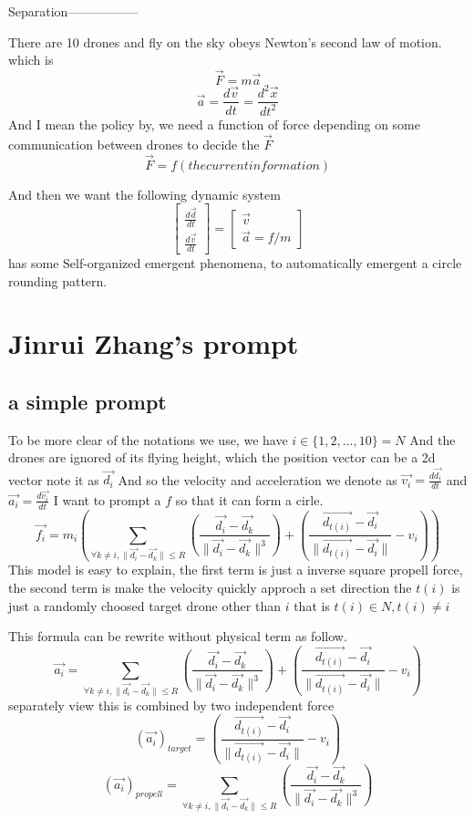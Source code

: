 \documentclass{article}
\theoremstyle{definition} %
\begin{document}
Separation-----------------

There are 10 drones and fly on the sky
obeys Newton's second law of motion.
which is
\[
    \vec{F} = m \vec{a}
\]
\[
    \vec{a} = \frac{d\vec{v}}{dt} = \frac{d^2 \vec{x}}{dt^2}
\]
And I mean the policy by, we need a function of force
depending on some communication between drones
to decide the \(\vec{F}\)
\[
    \vec{F}=f(the current information)
\]

And then we want the following dynamic system
\[\begin{bmatrix}
        \frac{d\vec{d}}{dt} \\
        \frac{d\vec{v}}{dt}
    \end{bmatrix}=
    \begin{bmatrix}
        \vec{v} \\
        \vec{a}=f/m
    \end{bmatrix}
\]
has some Self-organized emergent phenomena,
to automatically emergent a circle rounding pattern.

\section{Jinrui Zhang's prompt}
\subsection{a simple prompt}
To be more clear of the notations we use,
we have \(i\in\{1,2,...,10\}=N\)
And the drones are ignored of its flying
height, which the position vector can be a
2d vector note it as \(\vec{d_i}\)
And so the velocity and acceleration we denote as
\(\vec{v_i}=\frac{d\vec{d_i}}{dt}\)
and
\(\vec{a_i}=\frac{d\vec{v_i}}{dt}\)
I want to prompt a \(f\) so that it can form
a cirle.
\[
    \vec{f_i}=m_i(\sum_{\forall k\neq i,\|\vec{d_i}-\vec{d_k}\|\leq R}(\frac{\vec{d_i}-\vec{d_k}}{\|\vec{d_i}-\vec{d_k}\|^3})+(\frac{\vec{d_{t(i)}}-\vec{d_i}}{\|\vec{d_{t(i)}}-\vec{d_i}\|}-v_i))
\]
This model is easy to explain, the first term is
just a inverse square propell force, the second
term is make the velocity quickly approch a set direction
the \(t(i)\) is just a randomly choosed target drone
other than \(i\) that is \(t(i)\in N, t(i)\neq i\)

This formula can be rewrite without physical term as
follow.
\[
    \vec{a_i}=\sum_{\forall k\neq i,\|\vec{d_i}-\vec{d_k}\|\leq R}(\frac{\vec{d_i}-\vec{d_k}}{\|\vec{d_i}-\vec{d_k}\|^3})+(\frac{\vec{d_{t(i)}}-\vec{d_i}}{\|\vec{d_{t(i)}}-\vec{d_i}\|}-v_i)
\]
separately view this is combined by two independent force
\[
    (\vec{a_i})_{target}=(\frac{\vec{d_{t(i)}}-\vec{d_i}}{\|\vec{d_{t(i)}}-\vec{d_i}\|}-v_i)
\]
\[
    (\vec{a_i})_{propell}=\sum_{\forall k\neq i,\|\vec{d_i}-\vec{d_k}\|\leq R}(\frac{\vec{d_i}-\vec{d_k}}{\|\vec{d_i}-\vec{d_k}\|^3})
\]
\end{document}
